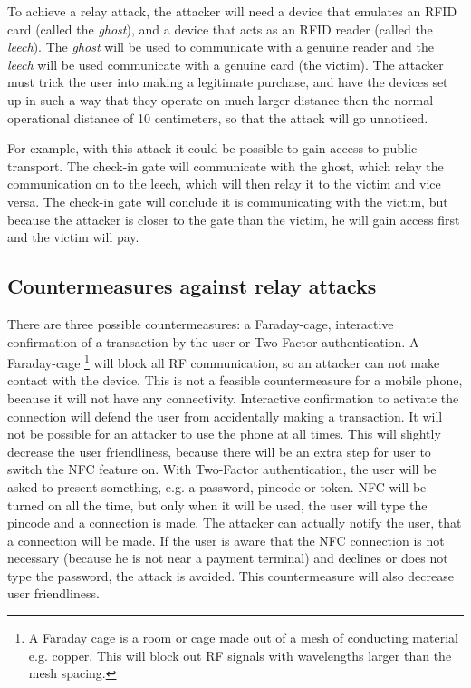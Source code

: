 To achieve a relay attack, the attacker will need a device that emulates an RFID card (called the \textit{ghost}), and a device that acts as an RFID reader (called the \textit{leech}).
The \textit{ghost} will be used to communicate with a genuine reader and the \textit{leech} will be used communicate with a genuine card (the victim).
The attacker must trick the user into making a legitimate purchase, and have the devices set up in such a way that they operate on much larger distance then the normal operational distance of 10 centimeters, so that the attack will go unnoticed. \cite{1128470}

For example, with this attack it could be possible to gain access to public transport.
The check-in gate will communicate with the ghost, which relay the communication on to the leech, which will then relay it to the victim and vice versa.
The check-in gate will conclude it is communicating with the victim, but because the attacker is closer to the gate than the victim, he will gain access first and the victim will pay.

\subsection{Countermeasures against relay attacks}
There are three possible countermeasures: a Faraday-cage, interactive confirmation of a transaction by the user or Two-Factor authentication.
A Faraday-cage \footnote{A Faraday cage is a room or cage made out of a mesh of conducting material e.g. copper. This will block out RF signals with wavelengths larger than the mesh spacing.}  will block all RF communication, so an attacker can not make contact with the device.
This is not a feasible countermeasure for a mobile phone, because it will not have any connectivity.
Interactive confirmation to activate the connection will defend the user from accidentally making a transaction.
It will not be possible for an attacker to use the phone at all times.
This will slightly decrease the user friendliness, because there will be an extra step for user to switch the NFC feature on.
With Two-Factor authentication, the user will be asked to present something, e.g. a password, pincode or token.
NFC will be turned on all the time, but only when it will be used, the user will type the pincode and a connection is made.
The attacker can actually notify the user, that a connection will be made.
If the user is aware that the NFC connection is not necessary (because he is not near a payment terminal) and declines or does not type the password, the attack is avoided.
This countermeasure will also decrease user friendliness. \cite{1128470}

